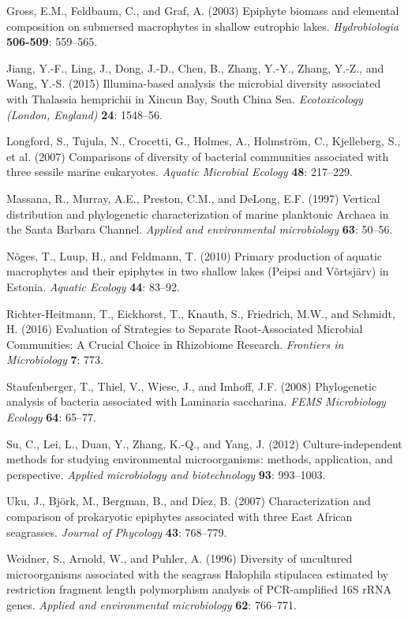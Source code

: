 \documentclass[12pt,]{article}
\begin{document}
\hypertarget{ref-Gross2003}{}
Gross, E.M., Feldbaum, C., and Graf, A. (2003) Epiphyte biomass and
elemental composition on submersed macrophytes in shallow eutrophic
lakes. \emph{Hydrobiologia} \textbf{506-509}: 559--565.

\hypertarget{ref-Jiang2015}{}
Jiang, Y.-F., Ling, J., Dong, J.-D., Chen, B., Zhang, Y.-Y., Zhang,
Y.-Z., and Wang, Y.-S. (2015) Illumina-based analysis the microbial
diversity associated with Thalassia hemprichii in Xincun Bay, South
China Sea. \emph{Ecotoxicology (London, England)} \textbf{24}: 1548--56.

\hypertarget{ref-Longford2007}{}
Longford, S., Tujula, N., Crocetti, G., Holmes, A., Holmström, C.,
Kjelleberg, S., et al. (2007) Comparisons of diversity of bacterial
communities associated with three sessile marine eukaryotes.
\emph{Aquatic Microbial Ecology} \textbf{48}: 217--229.

\hypertarget{ref-Massana1997}{}
Massana, R., Murray, A.E., Preston, C.M., and DeLong, E.F. (1997)
Vertical distribution and phylogenetic characterization of marine
planktonic Archaea in the Santa Barbara Channel. \emph{Applied and
environmental microbiology} \textbf{63}: 50--56.

\hypertarget{ref-Noges2010}{}
Nõges, T., Luup, H., and Feldmann, T. (2010) Primary production of
aquatic macrophytes and their epiphytes in two shallow lakes (Peipsi and
Võrtsjärv) in Estonia. \emph{Aquatic Ecology} \textbf{44}: 83--92.

\hypertarget{ref-Richter-Heitmann2016}{}
Richter-Heitmann, T., Eickhorst, T., Knauth, S., Friedrich, M.W., and
Schmidt, H. (2016) Evaluation of Strategies to Separate Root-Associated
Microbial Communities: A Crucial Choice in Rhizobiome Research.
\emph{Frontiers in Microbiology} \textbf{7}: 773.

\hypertarget{ref-Staufenberger2008}{}
Staufenberger, T., Thiel, V., Wiese, J., and Imhoff, J.F. (2008)
Phylogenetic analysis of bacteria associated with Laminaria saccharina.
\emph{FEMS Microbiology Ecology} \textbf{64}: 65--77.

\hypertarget{ref-Su2012}{}
Su, C., Lei, L., Duan, Y., Zhang, K.-Q., and Yang, J. (2012)
Culture-independent methods for studying environmental microorganisms:
methods, application, and perspective. \emph{Applied microbiology and
biotechnology} \textbf{93}: 993--1003.

\hypertarget{ref-Uku2007}{}
Uku, J., Björk, M., Bergman, B., and Díez, B. (2007) Characterization
and comparison of prokaryotic epiphytes associated with three East
African seagrasses. \emph{Journal of Phycology} \textbf{43}: 768--779.

\hypertarget{ref-Weidner1996}{}
Weidner, S., Arnold, W., and Puhler, A. (1996) Diversity of uncultured
microorganisms associated with the seagrass Halophila stipulacea
estimated by restriction fragment length polymorphism analysis of
PCR-amplified 16S rRNA genes. \emph{Applied and environmental
microbiology} \textbf{62}: 766--771.
\end{document}
